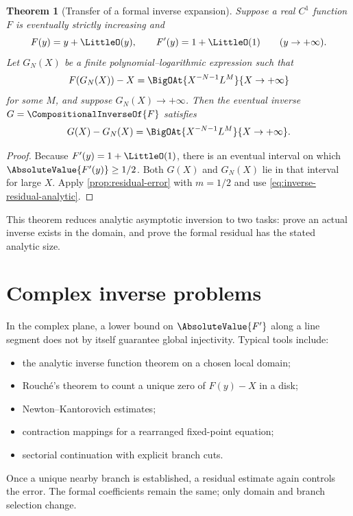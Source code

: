 \documentclass[11pt,openany]{book}
\theoremstyle{definition}
\theoremstyle{plain}
\newtheorem{theorem}{Theorem}[chapter]
\theoremstyle{remark}
\newcommand{\rev}[1]{\CompositionalInverseOf{#1}}
\begin{document}
\begin{theorem}[Transfer of a formal inverse expansion]\label{thm:analytic-inverse-transfer}
Suppose a real \(C^1\) function \(F\) is eventually strictly increasing and
\[
 F(y)=y+\LittleO(y),
 \qquad
 F'(y)=1+\LittleO(1)
 \qquad (y\to+\infty).
\]
Let \(G_N(X)\) be a finite polynomial--logarithmic expression such that
\begin{equation}\label{eq:inverse-residual-analytic}
 F(G_N(X))-X
 =\BigOAt{X^{-N-1}L^M}{X\to+\infty}
\end{equation}
for some \(M\), and suppose \(G_N(X)\to+\infty\).  Then the eventual inverse
\(G=\rev{F}\) satisfies
\begin{equation}\label{eq:inverse-error-transfer}
 G(X)-G_N(X)
 =\BigOAt{X^{-N-1}L^M}{X\to+\infty}.
\end{equation}
\end{theorem}
\begin{proof}
Because \(F'(y)=1+\LittleO(1)\), there is an eventual interval on which
\(\AbsoluteValue{F'(y)}\ge1/2\).  Both \(G(X)\) and \(G_N(X)\) lie in that interval for large
\(X\).  Apply \cref{prop:residual-error} with \(m=1/2\) and use
\cref{eq:inverse-residual-analytic}.
\end{proof}

This theorem reduces analytic asymptotic inversion to two tasks: prove an
actual inverse exists in the domain, and prove the formal residual has the
stated analytic size.

\section{Complex inverse problems}
In the complex plane, a lower bound on \(\AbsoluteValue{F'}\) along a line segment does not by
itself guarantee global injectivity.  Typical tools include:
\begin{itemize}
\item the analytic inverse function theorem on a chosen local domain;
\item Rouché's theorem to count a unique zero of \(F(y)-X\) in a disk;
\item Newton--Kantorovich estimates;
\item contraction mappings for a rearranged fixed-point equation;
\item sectorial continuation with explicit branch cuts.
\end{itemize}
Once a unique nearby branch is established, a residual estimate again controls
the error.  The formal coefficients remain the same; only domain and branch
selection change.
\end{document}
